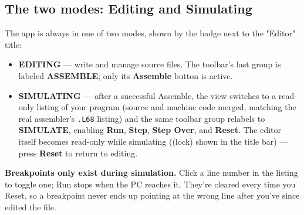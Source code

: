 \subsection*{The two modes: Editing and Simulating}
The app is always in one of two modes, shown by the badge next to the "Editor" title:

\begin{itemize}
\item \textbf{EDITING} — write and manage source files. The toolbar's last group is labeled \textbf{ASSEMBLE}; only its \textbf{Assemble} button is active.
\item \textbf{SIMULATING} — after a successful Assemble, the view switches to a read-only listing of your program (source and machine code merged, matching the real assembler's \texttt{.L68} listing) and the same toolbar group relabels to \textbf{SIMULATE}, enabling \textbf{Run}, \textbf{Step}, \textbf{Step Over}, and \textbf{Reset}. The editor itself becomes read-only while simulating ((lock) shown in the title bar) — press \textbf{Reset} to return to editing.
\end{itemize}
\begin{tcolorbox}[colback=blue!5!white,colframe=blue!60!black,title=Note]
\textbf{Breakpoints only exist during simulation.} Click a line number in the listing to toggle one; Run stops when the PC reaches it. They're cleared every time you Reset, so a breakpoint never ends up pointing at the wrong line after you've since edited the file.
\end{tcolorbox}